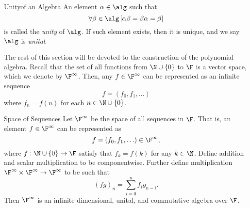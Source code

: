 \documentclass[math_245.tex]{subfiles}
\begin{document}
    \begin{definition}{Unity}{of an Algebra}
        An element $\alpha\in\alg$ such that
        \begin{equation*}
            \forall\beta\in\alg \left[ \alpha\beta = \beta\alpha = \beta \right]  
        \end{equation*}
        is called the \emph{unity} of $\alg$. If such element exists, then it is unique, and we say $\alg$ is \emph{unital}.
    \end{definition}

    \begin{remark}
        The rest of this section will be devoted to the construction of the polynomial algebra. Recall that the set of all functions from $\N\cup \left\lbrace 0 \right\rbrace$ to $\F$ is a vector space, which we denote by $\F^\infty$. Then, any $f\in\F^\infty$ can be represented as an infinite sequence
        \begin{equation*}
            f = \left( f_0, f_1, \ldots \right) 
        \end{equation*}
        where $f_n = f(n)$ for each $n\in\N\cup \left\lbrace 0 \right\rbrace$.
    \end{remark}

    \begin{prop}{Space of Sequences}
        Let $\F^\infty$ be the space of all sequences in $\F$. That is, an element $f\in \F^\infty$ can be represented as
        \begin{equation*}
            f = \left( f_0, f_1, \ldots \right) \in \F^\infty, 
        \end{equation*}
        where $f: \N\cup \left\lbrace 0 \right\rbrace \to \F$ satisfy that $f_k = f(k)$ for any $k\in \N$. Define addition and scalar multiplication to be componentwise. Further define multiplication $\F^\infty\times\F^\infty\to\F^\infty$ to be such that
        \begin{equation*}
            \left( fg \right)_n = \sum^n_{i=0} f_ig_{n-i}.
        \end{equation*}
        Then $\F^\infty$ is an infinite-dimensional, unital, and commutative algebra over $\F$.
    \end{prop}
\end{document}
